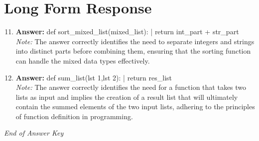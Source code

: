 \documentclass[12pt]{article}
\begin{document}
\section*{Long Form Response}
\begin{enumerate}[label=\arabic*.]
\setcounter{enumi}{10}
\item \textbf{Answer:} def sort\_mixed\_list(mixed\_list): | return int\_part + str\_part
\\ \textit{Note:} The answer correctly identifies the need to separate integers and strings into distinct parts before combining them, ensuring that the sorting function can handle the mixed data types effectively.
\item \textbf{Answer:} def sum\_list(lst 1,lst 2): | return res\_list
\\ \textit{Note:} The answer correctly identifies the need for a function that takes two lists as input and implies the creation of a result list that will ultimately contain the summed elements of the two input lists, adhering to the principles of function definition in programming.
\end{enumerate}

\vfill
\noindent\textit{End of Answer Key}
\end{document}
